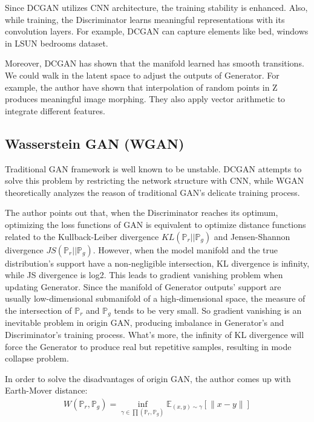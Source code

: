 Since DCGAN utilizes CNN architecture, the training stability is enhanced. Also, while training, the Discriminator learns meaningful representations with its convolution layers. For example, DCGAN can capture elements like bed, windows in LSUN bedrooms dataset. 

Moreover, DCGAN has shown that the manifold learned has smooth transitions. We could walk in the latent space to adjust the outputs of Generator. For example, the author have shown that interpolation of random points in Z produces meaningful image morphing. They also apply vector arithmetic to integrate different features.


\subsection{Wasserstein GAN (WGAN)}
Traditional GAN framework is well known to be unstable. DCGAN attempts to solve this problem by restricting the network structure with CNN, while WGAN theoretically analyzes the reason of traditional GAN's delicate training process.

The author points out that, when the Discriminator reaches its optimum, optimizing the loss functions of GAN is equivalent to optimize distance functions related to the Kullback-Leiber divergence $KL(\mathbb{P}_r||\mathbb{P}_g)$ and Jensen-Shannon divergence $JS(\mathbb{P}_r||\mathbb{P}_g)$. However, when the model manifold and the true distribution's support have a non-negligible intersection, KL divergence is infinity, while JS divergence is log2. This leads to gradient vanishing problem when updating Generator. Since the manifold of Generator outputs' support are usually low-dimensional submanifold of a high-dimensional space, the measure of the intersection of $\mathbb{P}_r$ and $\mathbb{P}_g$ tends to be very small. So gradient vanishing is an inevitable problem in origin GAN, producing imbalance in Generator’s and Discriminator’s training process. What's more, the infinity of KL divergence will force the Generator to produce real but repetitive samples, resulting in mode collapse problem.

In order to solve the disadvantages of origin GAN, the author comes up with Earth-Mover distance:
\begin{equation}
\begin{aligned}
W(\mathbb{P}_r,\mathbb{P}_g) = \inf \limits_{\gamma \in \prod(\mathbb{P}_r,\mathbb{P}_g)} \mathbb{E}_{(x,y)\sim \gamma}[\|x-y\|]
\end{aligned}
\end{equation}

